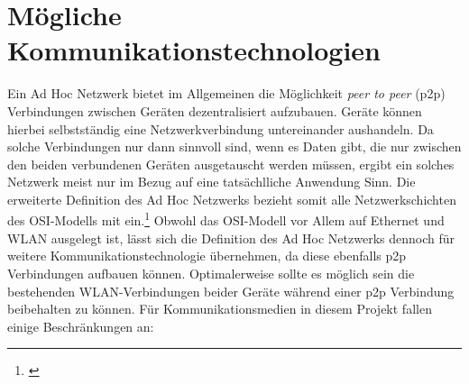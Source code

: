 \documentclass[12pt,a4paper]{article}
\begin{document}
    \section{Mögliche Kommunikationstechnologien}
        Ein Ad Hoc Netzwerk bietet im Allgemeinen die Möglichkeit {\it peer to peer} (p2p) Verbindungen zwischen Geräten dezentralisiert aufzubauen.
        Geräte können hierbei selbstständig eine Netzwerkverbindung untereinander aushandeln. Da solche Verbindungen nur dann sinnvoll sind,
        wenn es Daten gibt, die nur zwischen den beiden verbundenen Geräten ausgetauscht werden müssen, ergibt ein solches Netzwerk meist nur
        im Bezug auf eine tatsächlliche Anwendung Sinn. Die erweiterte Definition des Ad Hoc Netzwerks
        bezieht somit alle Netzwerkschichten des OSI-Modells mit ein.\footnote{\cite[S.23]{Sikora}}
        Obwohl das OSI-Modell vor Allem auf Ethernet und WLAN ausgelegt ist, lässt sich die Definition des Ad Hoc Netzwerks
        dennoch für weitere Kommunikationstechnologie übernehmen, da diese ebenfalls p2p Verbindungen aufbauen können.
        Optimalerweise sollte es möglich sein die bestehenden WLAN-Verbindungen beider Geräte während einer p2p Verbindung beibehalten zu können.
        Für Kommunikationsmedien in diesem Projekt fallen einige Beschränkungen an: 
\end{document}
